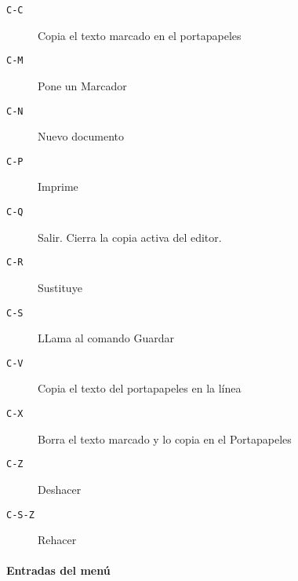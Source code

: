 \begin{description}
\item[{\tt C-C}] Copia el texto marcado en el portapapeles

\item[{\tt C-M}] Pone un Marcador

\item[{\tt C-N}] Nuevo documento

\item[{\tt C-P}] Imprime

\item[{\tt C-Q}] Salir. Cierra la copia activa del editor.

\item[{\tt C-R}] Sustituye

\item[{\tt C-S}] LLama al comando Guardar

\item[{\tt C-V}] Copia el texto del portapapeles en la línea

\item[{\tt C-X}] Borra el texto marcado y lo copia en el Portapapeles

\item[{\tt C-Z}] Deshacer

\item[{\tt C-S-Z}] Rehacer

\end{description}

\paragraph{Entradas del menú}

